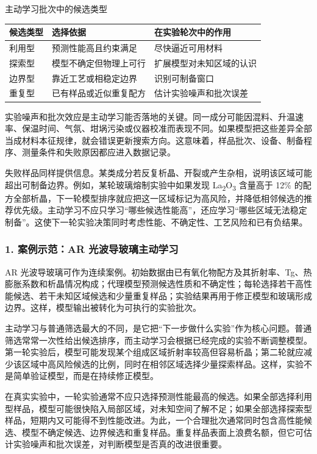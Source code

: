 \begin{formalTable}[htbp]
\caption{主动学习批次中的候选类型}
\label{tab:active-learning-batch-types}
\begin{tabularx}{\textwidth}{@{}YYY@{}}
\toprule
\textbf{候选类型} & \textbf{选择依据} & \textbf{在实验轮次中的作用} \\
\midrule
利用型 & 预测性能高且约束满足 & 尽快逼近可用材料 \\
探索型 & 模型不确定但物理上可行 & 扩展模型对未知区域的认识 \\
边界型 & 靠近工艺或相稳定边界 & 识别可制备窗口 \\
重复型 & 已有样品或近似重复配方 & 估计实验噪声和批次误差 \\
\bottomrule
\end{tabularx}
\end{formalTable}

实验噪声和批次效应是主动学习能否落地的关键。同一成分可能因混料、升温速率、保温时间、气氛、坩埚污染或仪器校准而表现不同。如果模型把这些差异全部当成材料本征规律，就会错误更新搜索方向。这意味着，样品批次、设备、制备程序、测量条件和失败原因都应进入数据记录。


失败样品同样提供信息。某类成分若反复析晶、开裂或产生杂相，说明该区域可能超出可制备边界。例如，某轮玻璃熔制实验中如果发现 La\textsubscript{2}O\textsubscript{3} 含量高于 12\% 的配方全部析晶，下一轮模型排序就应把这一区域标记为高风险，并降低相邻候选的推荐优先级。主动学习不应只学习“哪些候选性能高”，还应学习“哪些区域无法稳定制备”。这使下一轮实验决策同时考虑性能、不确定性、工艺风险和已有负结果。


\subsubsection*{\textbf{1. 案例示范：AR 光波导玻璃主动学习}}

AR 光波导玻璃可作为连续案例。初始数据由已有氧化物配方及其折射率、Tg、热膨胀系数和析晶情况构成；代理模型预测候选性质和不确定性；每轮选择若干高性能候选、若干未知区域候选和少量重复样品；实验结果再用于修正模型和玻璃形成边界。这样，模型输出被转化为可执行的实验批次。

主动学习与普通筛选最大的不同，是它把“下一步做什么实验”作为核心问题。普通筛选常常一次性给出候选排序，而主动学习会根据已经完成的实验不断调整模型。第一轮实验后，模型可能发现某个组成区域折射率较高但容易析晶；第二轮就应减少该区域中高风险候选的比例，同时在相邻区域选择少量探索样品。这样，实验不是简单验证模型，而是在持续修正模型。

在真实实验中，一轮实验通常不应只选择预测性能最高的候选。如果全部选择利用型样品，模型可能很快陷入局部区域，对未知空间了解不足；如果全部选择探索型样品，短期内又可能得不到性能改进。为此，一个合理批次通常同时包含高性能候选、模型不确定候选、边界候选和重复样品。重复样品表面上浪费名额，但它可估计实验噪声和批次误差，对判断模型是否真的改进很重要。

